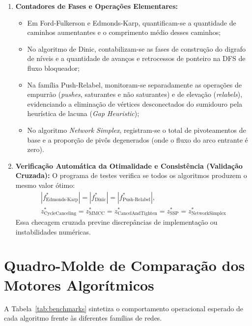 \begin{enumerate}
    \item \textbf{Contadores de Fases e Operações Elementares:}
    \begin{itemize}
        \item Em Ford-Fulkerson e Edmonds-Karp, quantificam-se a quantidade de caminhos aumentantes e o comprimento médio desses caminhos;
        \item No algoritmo de Dinic, contabilizam-se as fases de construção do digrafo de níveis e a quantidade de avanços e retrocessos de ponteiro na DFS de fluxo bloqueador;
        \item Na família Push-Relabel, monitoram-se separadamente as operações de empurrão (\textit{pushes}, saturantes e não saturantes) e de elevação (\textit{relabels}), evidenciando a eliminação de vértices desconectados do sumidouro pela heurística de lacuna (\textit{Gap Heuristic});
        \item No algoritmo \textit{Network Simplex}, registram-se o total de pivoteamentos de base e a proporção de pivôs degenerados (onde o fluxo do arco entrante é zero).
    \end{itemize}

    \item \textbf{Verificação Automática da Otimalidade e Consistência (Validação Cruzada):} O programa de testes verifica se todos os algoritmos produzem o mesmo valor ótimo:
    \begin{gather}
        |f^*_{\text{Edmonds-Karp}}| = |f^*_{\text{Dinic}}| = |f^*_{\text{Push-Relabel}}|, \\
        z^*_{\text{CycleCanceling}} = z^*_{\text{MMCC}} = z^*_{\text{CancelAndTighten}} = z^*_{\text{SSP}} = z^*_{\text{NetworkSimplex}}
    \end{gather}
    Essa checagem cruzada previne discrepâncias de implementação ou instabilidades numéricas.
\end{enumerate}


\section{Quadro-Molde de Comparação dos Motores Algorítmicos}

A Tabela~\ref{tab:benchmarks} sintetiza o comportamento operacional esperado de cada algoritmo frente às diferentes famílias de redes.

